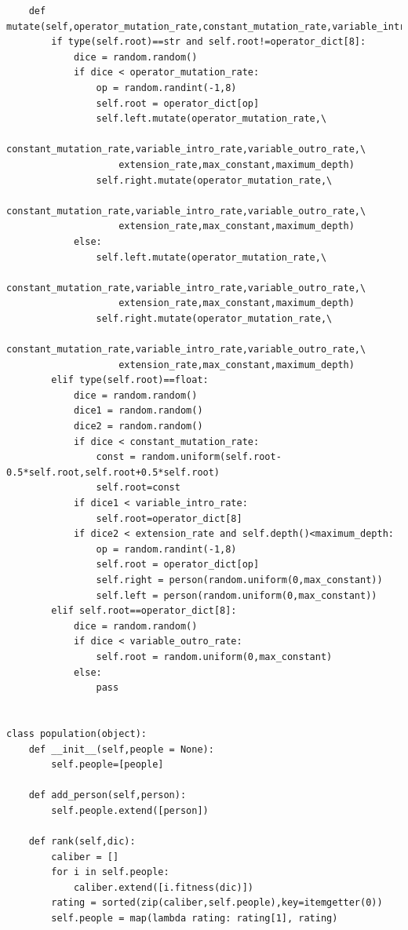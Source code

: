 \documentclass[11pt,amsmath,amssymb]{revtex4}
\begin{document}
\begin{lstlisting}
    def mutate(self,operator_mutation_rate,constant_mutation_rate,variable_intro_rate,variable_outro_rate,extension_rate,max_constant,maximum_depth):
        if type(self.root)==str and self.root!=operator_dict[8]:
            dice = random.random()
            if dice < operator_mutation_rate:
                op = random.randint(-1,8)
                self.root = operator_dict[op]
                self.left.mutate(operator_mutation_rate,\
                    constant_mutation_rate,variable_intro_rate,variable_outro_rate,\
                    extension_rate,max_constant,maximum_depth)
                self.right.mutate(operator_mutation_rate,\
                    constant_mutation_rate,variable_intro_rate,variable_outro_rate,\
                    extension_rate,max_constant,maximum_depth)
            else:
                self.left.mutate(operator_mutation_rate,\
                    constant_mutation_rate,variable_intro_rate,variable_outro_rate,\
                    extension_rate,max_constant,maximum_depth)
                self.right.mutate(operator_mutation_rate,\
                    constant_mutation_rate,variable_intro_rate,variable_outro_rate,\
                    extension_rate,max_constant,maximum_depth)
        elif type(self.root)==float:
            dice = random.random()
            dice1 = random.random()
            dice2 = random.random()
            if dice < constant_mutation_rate:
                const = random.uniform(self.root-0.5*self.root,self.root+0.5*self.root)
                self.root=const
            if dice1 < variable_intro_rate:
                self.root=operator_dict[8]
            if dice2 < extension_rate and self.depth()<maximum_depth:
                op = random.randint(-1,8)
                self.root = operator_dict[op]
                self.right = person(random.uniform(0,max_constant))
                self.left = person(random.uniform(0,max_constant))
        elif self.root==operator_dict[8]:
            dice = random.random()
            if dice < variable_outro_rate:
                self.root = random.uniform(0,max_constant)
            else:
                pass


class population(object):
    def __init__(self,people = None):
        self.people=[people]

    def add_person(self,person):
        self.people.extend([person])

    def rank(self,dic):
        caliber = []
        for i in self.people:
            caliber.extend([i.fitness(dic)])
        rating = sorted(zip(caliber,self.people),key=itemgetter(0))
        self.people = map(lambda rating: rating[1], rating)


\end{lstlisting}
\end{document}

